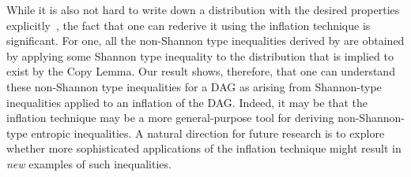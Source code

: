 While it is also not hard to write down a distribution with the desired properties explicitly~\cite[Lemma~15.8]{yeung_network_2008}, the fact that one can rederive it using the inflation technique is significant.  For one, all the non-Shannon type inequalities derived by \citet{zeger_2011_nonshannon} are obtained by applying some Shannon type inequality to the distribution that is implied to exist by the Copy Lemma.  Our result shows, therefore, that one can understand these non-Shannon type inequalities for a DAG as arising from Shannon-type inequalities applied to an inflation of the DAG.  Indeed, it may be that the inflation technique may be a more general-purpose tool for deriving non-Shannon-type entropic inequalities.  A natural direction for future research is to explore whether more sophisticated applications of the inflation technique might result  in \emph{new} examples of such inequalities. 


